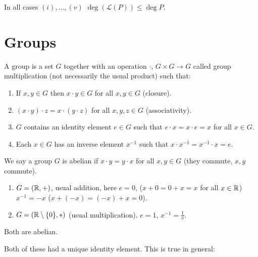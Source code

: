 \documentclass[10pt, a4paper]{article}
\begin{document}
In all cases $(i), \dotsc, (v)$
$\deg(\mathcal{L}(P)) \leq \deg{P}$.

\newpage

\section{Groups}

\begin{definition}
    A group is a set $G$ together with an operation $\cdot$,
    $G \times G \to G$ called group multiplication
    (not necessarily the usual product)
    such that:
    \begin{enumerate}[label = (\roman*)]
        \item If $x, y \in G$ then $x \cdot y \in G$ for all $x, y \in G$
        (closure).

        \item $(x \cdot y) \cdot z = x \cdot (y \cdot z)$ for all $x, y, z \in G$
        (associativity).

        \item $G$ contains an identity element $e \in G$ such that $e \cdot x = x \cdot e = x$ for all $x \in G$.

        \item Each $x \in G$ has an inverse element $x ^ {-1}$ such that $x \cdot x ^ {-1} = x ^ {-1} \cdot x = e$.
    \end{enumerate}
\end{definition}

We say a group $G$ is abelian if $x \cdot y = y \cdot x$ for all $x, y \in G$
(they commute,
$x, y$ commute).

\begin{example}\phantom{}
    \begin{enumerate}[label = (\roman*)]
        \item
        $G = (\mathbb{R}, +)$,
        usual addition,
        here $e = 0$,
        ($x + 0 = 0 + x = x$ for all $x \in \mathbb{R}$)
        $x ^ {-1} = -x$
        ($x + (-x) = (-x) + x = 0$).

        \item $G = (\mathbb{R} \setminus \{0\}, *)$
        (usual multiplication).
        $e = 1$,
        $x ^ {-1} = \frac{1}{x}$.
    \end{enumerate}
    
    Both are abelian.
\end{example}

Both of these had a unique identity element.
This is true in general:
\end{document}
